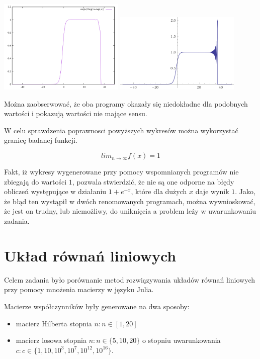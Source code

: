 \documentclass{article}
\begin{document}
\begin{center}
\includegraphics[width=0.45\textwidth]{img/gnuplot.png}
\includegraphics[width=0.45\textwidth]{img/wolfram_plot.png}
\end{center}

Można zaobserwować, że oba programy okazały się niedokładne dla podobnych wartości i pokazują wartości nie mające sensu.

W celu sprawdzenia poprawnosci powyższych wykresów można wykorzystać granicę badanej funkcji.

$$
lim_{n \to \infty} f(x) = 1
$$

Fakt, iż wykresy wygenerowane przy pomocy wspomnianych programów nie zbiegają do wartości $1$, pozwala stwierdzić, że nie są one odporne na błędy obliczeń występujące w działaniu $1+e^{-x}$, które dla dużych $x$ daje wynik $1$.
Jako, że błąd ten wystąpił w dwóch renomowanych programach, można wywnioskować, że jest on trudny, lub niemożliwy, do uniknięcia a problem leży w uwarunkowaniu zadania.

\section{Układ równań liniowych}

Celem zadania było porównanie metod rozwiązywania układów równań liniowych przy pomocy mnożenia macierzy w języku Julia.

Macierze współczynników były generowane na dwa sposoby:
\begin{itemize}
  \item macierz Hilberta stopnia $n : n \in [1,20]$
  \item macierz losowa stopnia $n : n \in \{5,10,20\}$ o stopniu uwarunkowania $c : c\in \{1, 10, 10^3, 10^7, 10^12, 10^16\}$.
\end{itemize}
\end{document}

